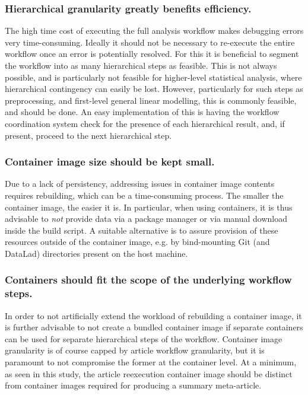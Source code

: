 \subsubsection{Hierarchical granularity greatly benefits efficiency.}
The high time cost of executing the full analysis workflow makes debugging errors very time-consuming.
Ideally it should not be necessary to re-execute the entire workflow once an error is potentially resolved.
For this it is beneficial to segment the workflow into as many hierarchical steps as feasible.
This is not always possible, and is particularly not feasible for higher-level statistical analysis, where hierarchical contingency can easily be lost.
However, particularly for such steps as preprocessing, and first-level general linear modelling, this is commonly feasible, and should be done.
An easy implementation of this is having the workflow coordination system check for the presence of each hierarchical result, and, if present, proceed to the next hierarchical step.

\subsubsection{Container image size should be kept small.}
Due to a lack of persistency, addressing issues in container image contents requires rebuilding, which can be a time-consuming process.
The smaller the container image, the easier it is.
In particular, when using containers, it is thus advisable to \textit{not} provide data via a package manager or via manual download inside the build script.
A suitable alternative is to assure provision of these resources outside of the container image, e.g. by bind-mounting Git (and DataLad) directories present on the host machine.

\subsubsection{Containers should fit the scope of the underlying workflow steps.}
In order to not artificially extend the workload of rebuilding a container image, it is further advisable to not create a bundled container image if separate containers can be used for separate hierarchical steps of the workflow.
Container image granularity is of course capped by article workflow granularity, but it is paramount to not compromise the former at the container level.
At a minimum, as seen in this study, the article reexecution container image should be distinct from container images required for producing a summary meta-article.

